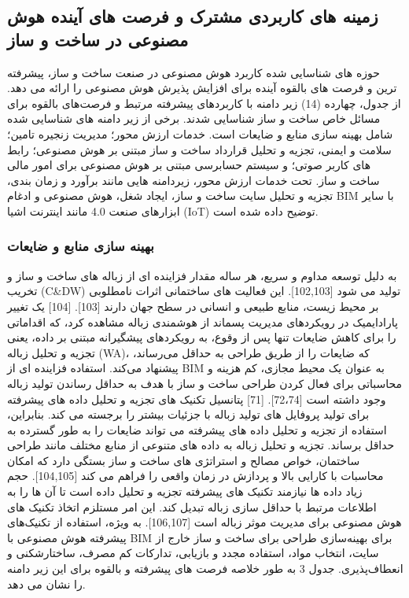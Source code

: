 \documentclass[towcolumn, 11pt]{Article}
\begin{document}
\begin{چکیده}
\subsection{زمینه های کاربردی مشترک و فرصت های آینده هوش مصنوعی در ساخت و ساز}
حوزه های شناسایی شده کاربرد هوش مصنوعی در صنعت ساخت و ساز، پیشرفته ترین و فرصت های بالقوه آینده برای افزایش پذیرش هوش مصنوعی را ارائه می دهد. از جدول، چهارده (14) زیر دامنه با کاربردهای پیشرفته مرتبط و فرصت‌های بالقوه برای مسائل خاص ساخت و ساز شناسایی شدند. برخی از زیر دامنه های شناسایی شده شامل بهینه سازی منابع و ضایعات است. خدمات ارزش محور؛ مدیریت زنجیره تامین؛ سلامت و ایمنی، تجزیه و تحلیل قرارداد ساخت و ساز مبتنی بر هوش مصنوعی؛ رابط های کاربر صوتی؛ و سیستم حسابرسی مبتنی بر هوش مصنوعی برای امور مالی ساخت و ساز. تحت خدمات ارزش محور، زیردامنه هایی مانند برآورد و زمان بندی، تجزیه و تحلیل سایت ساخت و ساز، ایجاد شغل، هوش مصنوعی و ادغام BIM با سایر ابزارهای صنعت 4.0 مانند اینترنت اشیا (IoT) توضیح داده شده است.

\subsubsection{بهینه سازی منابع و ضایعات}
به دلیل توسعه مداوم و سریع، هر ساله مقدار فزاینده ای از زباله های ساخت و ساز و تخریب (C&DW) تولید می شود [102,103]. این فعالیت های      ساختمانی اثرات نامطلوبی بر محیط زیست، منابع طبیعی و انسانی در سطح جهان دارند [103]. [104] یک تغییر پارادایمیک در رویکردهای مدیریت پسماند از هوشمندی زباله مشاهده کرد، که اقداماتی را برای کاهش ضایعات تنها پس از وقوع، به رویکردهای پیشگیرانه مبتنی بر داده، یعنی تجزیه و تحلیل زباله (WA)، که ضایعات را از طریق طراحی به حداقل می‌رساند، پیشنهاد می‌کند. استفاده فزاینده ای از BIM به عنوان یک محیط مجازی، کم هزینه و محاسباتی برای فعال کردن طراحی ساخت و ساز با هدف به حداقل رساندن تولید زباله وجود داشته است [72،74]. [71] پتانسیل تکنیک های تجزیه و تحلیل داده های پیشرفته برای تولید پروفایل های تولید زباله با جزئیات بیشتر را برجسته می کند. بنابراین، استفاده از تجزیه و تحلیل داده های پیشرفته می تواند ضایعات را به طور گسترده به حداقل برساند.
تجزیه و تحلیل زباله به داده های متنوعی از منابع مختلف مانند طراحی ساختمان، خواص مصالح و استراتژی های ساخت و ساز بستگی دارد که امکان محاسبات با کارایی بالا و پردازش در زمان واقعی را فراهم می کند [104,105]. حجم زیاد داده ها نیازمند تکنیک های پیشرفته تجزیه و تحلیل داده است تا آن ها را به اطلاعات مرتبط با حداقل سازی زباله تبدیل کند. این امر مستلزم اتخاذ تکنیک های هوش مصنوعی برای مدیریت موثر زباله است [106,107]. به ویژه، استفاده از تکنیک‌های پیشرفته هوش مصنوعی با BIM برای بهینه‌سازی طراحی برای ساخت و ساز خارج از سایت، انتخاب مواد، استفاده مجدد و بازیابی، تدارکات کم مصرف، ساختارشکنی و انعطاف‌پذیری. جدول 3 به طور خلاصه فرصت های پیشرفته و بالقوه برای این زیر دامنه را نشان می دهد.


\end{چکیده}
\end{document}
